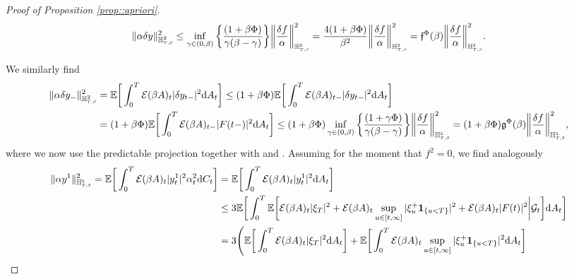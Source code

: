 \documentclass[10pt]{article} %
\newcommand\cE{\mathcal E}
\newcommand\cG{\mathcal G}
\newcommand{\smalltext}[1]{\text{\fontsize{4}{4}\selectfont$#1$}}
\newcommand\ff{\mathfrak f}
\newcommand\fg{\mathfrak g}
\def \E{\mathbb{E}}
\def \H{\mathbb{H}}
\newcommand{\1}{\mathbf{1}}
\def\d{\mathrm{d}}
\begin{document}
\begin{proof}[Proof of Proposition \ref{prop::apriori}]
\begin{equation}\label{eq::inequality_delta_y_H_2}
	\|\alpha \delta y\|^2_{\H^2_{\smalltext{T}\smalltext{,}\smalltext{\beta}}} 
	\leq \inf_{\gamma \in (0,\beta)}\bigg\{\frac{(1+\beta\Phi)}{\gamma(\beta-\gamma)}\bigg\}\bigg\| \frac{\delta f}{\alpha} \bigg\|^2_{\H^{\smalltext{2}}_{\smalltext{T}\smalltext{,}\smalltext{\beta}}} = \frac{4(1+\beta\Phi)}{\beta^2}\bigg\| \frac{\delta f}{\alpha} \bigg\|^2_{\H^{\smalltext{2}}_{\smalltext{T}\smalltext{,}\smalltext{\beta}}} = \ff^\Phi(\beta) \bigg\| \frac{\delta f}{\alpha} \bigg\|^2_{\H^{\smalltext{2}}_{\smalltext{T}\smalltext{,}\smalltext{\beta}}}.
\end{equation}

We similarly find
\begin{align}
	\|\alpha \delta y_-\|^2_{\H^2_{\smalltext{T}\smalltext{,}\smalltext{\beta}}} 
	&= \E \bigg[ \int_0^T \cE(\beta A)_t |\delta y_{t-}|^2 \d A_t \bigg] 
\leq (1+\beta\Phi)\E \bigg[ \int_0^T \cE(\beta A)_{t-}|\delta y_{t-}|^2 \d A_t \bigg] \label{eq::exp_minus_y_minus}\\
	&= (1+\beta\Phi)\E \bigg[ \int_0^T \cE(\beta A)_{t-} |F(t-)|^2 \d A_t \bigg]
	\leq (1+\beta\Phi)\inf_{\gamma \in (0,\beta)}\bigg\{\frac{(1+\gamma\Phi)}{\gamma(\beta - \gamma)}\bigg\} \bigg\|\frac{\delta f}{\alpha}\bigg\|^2_{\mathbb{H}^\smalltext{2}_{\smalltext{T}\smalltext{,}\smalltext{\beta}}}
	= (1+\beta\Phi) \fg^\Phi(\beta) \bigg\|\frac{\delta f}{\alpha}\bigg\|^2_{\mathbb{H}^\smalltext{2}_{\smalltext{T}\smalltext{,}\smalltext{\beta}}}, \nonumber
\end{align}
where we now use the predictable projection together with  and  \cite[Theorem VI.57]{dellacherie1982probabilities}. Assuming for the moment that $f^2 = 0$, we find analogously
\begin{align*}
	\|\alpha y^1\|^2_{\H^\smalltext{2}_{\smalltext{T}\smalltext{,}\smalltext{\beta}}} = \E \bigg[ \int_0^T \cE(\beta A)_t |y^1_t|^2 \alpha^2_t \d C_t \bigg] 
	&= \E \bigg[ \int_0^T \cE(\beta A)_t |y^1_{t}|^2 \d A_t \bigg] \\
	&\leq 3\E\bigg[ \int_0^T \E \bigg[\cE(\beta A)_t|\xi_T|^2 + \cE(\beta A)_t\sup_{u \in [t,\infty]}|\xi^+_u \mathbf{1}_{\{u < T\}}|^2 + \cE(\beta A)_t |F(t)|^2 \bigg| \cG_{t} \bigg] \d A_t \bigg] \\
	&= 3\Bigg(\E \bigg[ \int_0^T \cE(\beta A)_t |\xi_T|^2 \d A_t \bigg] + \E \bigg[ \int_0^T \cE(\beta A)_t \sup_{u \in [t,\infty]}|\xi^+_u \mathbf{1}_{\{u < T\}}|^2 \d A_t \bigg] \\

\end{align*}
\end{proof}
\end{document}

